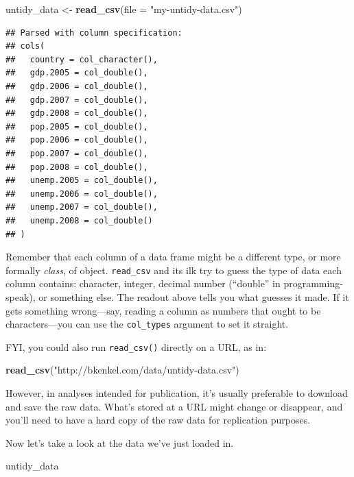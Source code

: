 \documentclass[
  12pt,
  oneside,openany]{book}
\newenvironment{Shaded}{\begin{snugshade}}{\end{snugshade}}
\newcommand{\DataTypeTok}[1]{\textcolor[rgb]{0.13,0.29,0.53}{#1}}
\newcommand{\KeywordTok}[1]{\textcolor[rgb]{0.13,0.29,0.53}{\textbf{#1}}}
\newcommand{\NormalTok}[1]{#1}
\newcommand{\StringTok}[1]{\textcolor[rgb]{0.31,0.60,0.02}{#1}}
\begin{document}
\begin{Shaded}
\begin{Highlighting}[]
\NormalTok{untidy\_data \textless{}{-}}\StringTok{ }\KeywordTok{read\_csv}\NormalTok{(}\DataTypeTok{file =} \StringTok{"my{-}untidy{-}data.csv"}\NormalTok{)}
\end{Highlighting}
\end{Shaded}

\begin{verbatim}
## Parsed with column specification:
## cols(
##   country = col_character(),
##   gdp.2005 = col_double(),
##   gdp.2006 = col_double(),
##   gdp.2007 = col_double(),
##   gdp.2008 = col_double(),
##   pop.2005 = col_double(),
##   pop.2006 = col_double(),
##   pop.2007 = col_double(),
##   pop.2008 = col_double(),
##   unemp.2005 = col_double(),
##   unemp.2006 = col_double(),
##   unemp.2007 = col_double(),
##   unemp.2008 = col_double()
## )
\end{verbatim}

Remember that each column of a data frame might be a different type, or more formally \emph{class}, of object. \texttt{read\_csv} and its ilk try to guess the type of data each column contains: character, integer, decimal number (``double'' in programming-speak), or something else. The readout above tells you what guesses it made. If it gets something wrong---say, reading a column as numbers that ought to be characters---you can use the \texttt{col\_types} argument to set it straight.

FYI, you could also run \texttt{read\_csv()} directly on a URL, as in:

\begin{Shaded}
\begin{Highlighting}[]
\KeywordTok{read\_csv}\NormalTok{(}\StringTok{"http://bkenkel.com/data/untidy{-}data.csv"}\NormalTok{)}
\end{Highlighting}
\end{Shaded}

However, in analyses intended for publication, it's usually preferable to download and save the raw data. What's stored at a URL might change or disappear, and you'll need to have a hard copy of the raw data for replication purposes.

Now let's take a look at the data we've just loaded in.

\begin{Shaded}
\begin{Highlighting}[]
\NormalTok{untidy\_data}
\end{Highlighting}
\end{Shaded}
\end{document}
